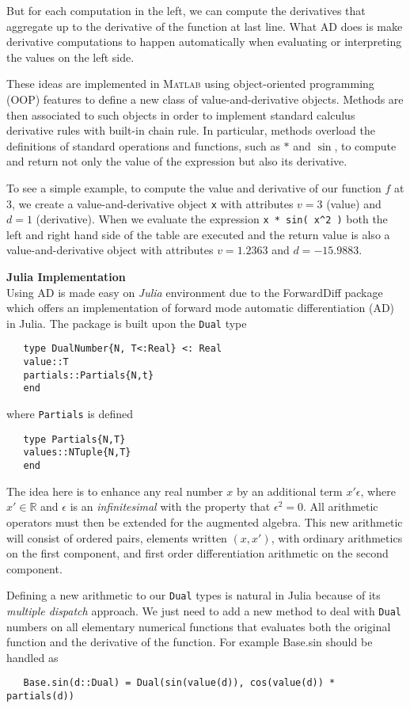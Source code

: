 \documentclass[a4paper,10pt]{article}  %
\begin{document}
But for each computation in the left, we can compute the derivatives that aggregate up to the derivative of
the function at last line. What AD does is make derivative computations to happen automatically
when evaluating or interpreting the values on the left side.

These ideas are implemented in \textsc{Matlab} using object-oriented programming (OOP) features to define a new class of value-and-derivative objects. Methods are then associated
to such objects in order to implement standard calculus derivative rules with built-in chain rule.
In particular, methods overload the definitions of standard operations and functions, such as $*$ and $\sin$,
to compute and return not only the value of the expression but also its derivative.

To see a simple example, to compute the value and derivative of our function $f$ at 3, we create a
value-and-derivative object \texttt{x} with attributes $v =3$ (value) and $d=1$ (derivative). When we evaluate
the expression \texttt{x * sin( x\^{}2 )} both the left and right hand side of the table are executed and the return value
is also a value-and-derivative object with attributes $v=1.2363$ and $d = −15.9883$.

\textbf{Julia Implementation} \\
Using AD is made easy on \emph{Julia} environment due to the ForwardDiff package which offers an implementation
of forward mode automatic differentiation (AD) in Julia. The package is built upon the \texttt{Dual} type

\begin{verbatim}
   type DualNumber{N, T<:Real} <: Real
   value::T
   partials::Partials{N,t}
   end
\end{verbatim}
where \texttt{Partials} is defined
\begin{verbatim}
   type Partials{N,T}
   values::NTuple{N,T}
   end
\end{verbatim}

The idea here is to enhance any real number $x$ by an additional term $ x' \epsilon $, where $ x'\in \mathbb{R} $ and $ \epsilon $ is an
\emph{infinitesimal} with the property that $ \epsilon^2 =0 $.
All arithmetic operators must then be extended for the augmented algebra.
This new arithmetic will consist of ordered pairs, elements written $ ( x,x') $,
with ordinary arithmetics on the first component, and first order differentiation arithmetic on
the second component.

Defining a new arithmetic to our \texttt{Dual} types is natural in Julia because of its \emph{multiple dispatch} approach.
We just need to add a new method to deal with \texttt{Dual} numbers on all elementary numerical functions
that evaluates both the original function and the derivative of the function. For example
Base.sin should be handled as
\begin{verbatim}
   Base.sin(d::Dual) = Dual(sin(value(d)), cos(value(d)) * partials(d))
\end{verbatim}
\end{document}
